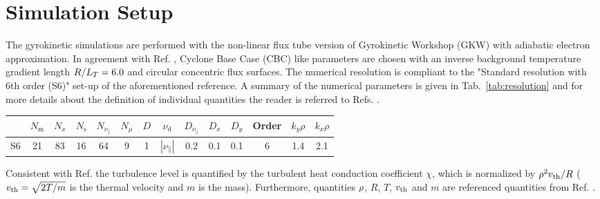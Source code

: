 \section{Simulation Setup}
\label{sec:simulation}

The gyrokinetic simulations are performed with the non-linear flux tube version of Gyrokinetic Workshop (GKW) \cite{Peeters2009} with adiabatic electron approximation. 
In agreement with Ref. , Cyclone Base Case (CBC) like parameters are chosen with an inverse background temperature gradient length $R/L_T = 6.0$ and circular concentric flux surfaces. 
The numerical resolution is compliant to the "Standard resolution with 6th order (S6)" set-up of the aforementioned reference. A summary of the numerical parameters is given in Tab.~\ref{tab:resolution} and for more details about the definition of individual quantities the reader is referred to Refs. .
\begin{center}
	\captionsetup{type=table}
	\begin{tabular}{l | ccccc | ccccc | c | cc}
		& $N_\mathrm{m}$ & $N_x$ & $N_\mathrm{s}$ & $N_{\nu_\parallel}$ & $N_\mu$ & $D$ & $\nu_\mathrm{d}$           & $D_{\nu_\parallel}$ & $D_x$ & $D_y$ & Order & $k_y\rho$ & $k_x\rho$ \\
		\hline
		S6   & 21    & 83    & 16    & 64                  & 9       & 1   & $|\nu_\parallel|$ & 0.2                 & 0.1   & 0.1   & 6     & 1.4       & 2.1       \\
	\end{tabular}
	\label{tab:resolutionBenchmark}
\end{center}

Consistent with Ref.  the turbulence level is quantified by the turbulent heat conduction coefficient $\chi$, which is normalized by $\rho^2 v_{\mathrm{th}}/R$ ($v_{\mathrm{th}} = \sqrt{2 T/m}$ is the thermal velocity and $m$ is the mass). Furthermore, quantities $\rho$, $R$, $T$, $v_{\mathrm{th}}$ and $m$ are referenced quantities from Ref. .